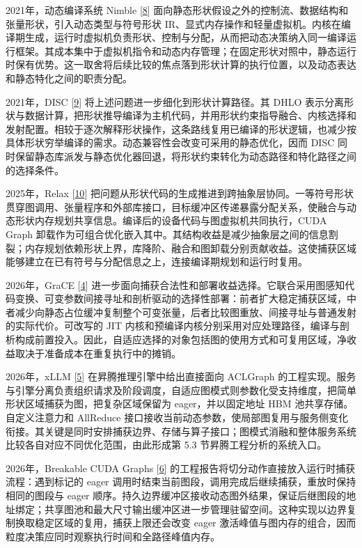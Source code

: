 \documentclass[UTF8,10.5pt,fontset=windows]{ctexart}
\begin{document}
2021年，动态编译系统 Nimble
{[}\protect\hyperlink{ref-shen2021nimble}{8}{]}
面向静态形状假设之外的控制流、数据结构和张量形状，引入动态类型与符号形状
IR、显式内存操作和轻量虚拟机。内核在编译期生成，运行时虚拟机负责形状、控制与分配，从而把动态决策纳入同一编译运行框架。其成本集中于虚拟机指令和动态内存管理；在固定形状对照中，静态运行时保有优势。这一取舍将后续比较的焦点落到形状计算的执行位置，以及动态表达和静态特化之间的职责分配。

2021年，DISC {[}\protect\hyperlink{ref-zhu2021disc}{9}{]}
将上述问题进一步细化到形状计算路径。其 DHLO
表示分离形状与数据计算，把形状推导编译为主机代码，并用形状约束指导融合、内核选择和发射配置。相较于逐次解释形状操作，这条路线复用已编译的形状逻辑，也减少按具体形状穷举编译的需求。动态兼容性会改变可采用的静态优化，因而
DISC
同时保留静态库派发与静态优化器回退，将形状约束转化为动态路径和特化路径之间的选择条件。

2025年，Relax {[}\protect\hyperlink{ref-lai2025relax}{10}{]}
把问题从形状代码的生成推进到跨抽象层协同。一等符号形状贯穿图调用、张量程序和外部库接口，目标缓冲区传递暴露分配关系，使融合与动态形状内存规划共享信息。编译后的设备代码与图虚拟机共同执行，CUDA
Graph
卸载作为可组合优化嵌入其中。其结构收益是减少抽象层之间的信息割裂；内存规划依赖形状上界，库降阶、融合和图卸载分别贡献收益。这使捕获区域能够建立在已有符号与分配信息之上，连接编译期规划和运行时复用。

2026年，GraCE {[}\protect\hyperlink{ref-ghosh2026grace}{4}{]}
进一步面向捕获合法性和部署收益选择。它联合采用图感知代码变换、可变参数间接寻址和剖析驱动的选择性部署：前者扩大稳定捕获区域，中者减少向静态占位缓冲复制整个可变张量，后者比较图重放、间接寻址与普通发射的实际代价。可改写的
JIT
内核和预编译内核分别采用对应处理路径，编译与剖析构成前置投入。因此，自适应选择的对象包括图的使用方式和可复用区域，净收益取决于准备成本在重复执行中的摊销。

2026年，xLLM {[}\protect\hyperlink{ref-liu2025xllm}{5}{]}
在昇腾推理引擎中给出直接面向 ACLGraph
的工程实现。服务与引擎分离负责组织请求及阶段调度，自适应图模式则参数化受支持维度，把简单形状区域捕获为图，把复杂区域保留为
eager，并以固定地址 HBM 池共享存储。自定义注意力和 AllReduce
接口接收当前动态参数，使局部图复用与服务侧变化衔接。其关键是同时安排捕获边界、存储与算子接口；图模式消融和整体服务系统比较各自对应不同优化范围，由此形成第
5.3 节昇腾工程分析的系统入口。

2026年，Breakable CUDA Graphs
{[}\protect\hyperlink{ref-lmsys2026breakable}{6}{]}
的工程报告将切分动作直接放入运行时捕获流程：遇到标记的 eager
调用时结束当前图段，调用完成后继续捕获，重放时保持相同的图段与 eager
顺序。持久边界缓冲区接收动态图外结果，保证后继图段的地址绑定；共享图池和最大尺寸输出缓冲区进一步管理驻留空间。这种实现以边界复制换取稳定区域的复用，捕获上限还会改变
eager
激活峰值与图内存的组合，因而粒度决策应同时观察执行时间和全路径峰值内存。
\end{document}
